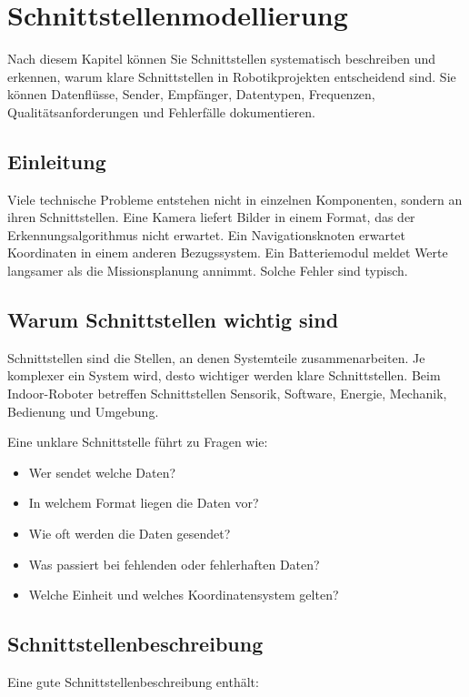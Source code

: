 \chapter{Schnittstellenmodellierung}

\begin{lernziele}
Nach diesem Kapitel können Sie Schnittstellen systematisch beschreiben und erkennen, warum klare Schnittstellen in Robotikprojekten entscheidend sind. Sie können Datenflüsse, Sender, Empfänger, Datentypen, Frequenzen, Qualitätsanforderungen und Fehlerfälle dokumentieren.
\end{lernziele}

\section{Einleitung}
Viele technische Probleme entstehen nicht in einzelnen Komponenten, sondern an ihren Schnittstellen. Eine Kamera liefert Bilder in einem Format, das der Erkennungsalgorithmus nicht erwartet. Ein Navigationsknoten erwartet Koordinaten in einem anderen Bezugssystem. Ein Batteriemodul meldet Werte langsamer als die Missionsplanung annimmt. Solche Fehler sind typisch.

\section{Warum Schnittstellen wichtig sind}
Schnittstellen sind die Stellen, an denen Systemteile zusammenarbeiten. Je komplexer ein System wird, desto wichtiger werden klare Schnittstellen. Beim Indoor-Roboter betreffen Schnittstellen Sensorik, Software, Energie, Mechanik, Bedienung und Umgebung.

Eine unklare Schnittstelle führt zu Fragen wie:

\begin{itemize}
    \item Wer sendet welche Daten?
    \item In welchem Format liegen die Daten vor?
    \item Wie oft werden die Daten gesendet?
    \item Was passiert bei fehlenden oder fehlerhaften Daten?
    \item Welche Einheit und welches Koordinatensystem gelten?
\end{itemize}

\section{Schnittstellenbeschreibung}
Eine gute Schnittstellenbeschreibung enthält:

